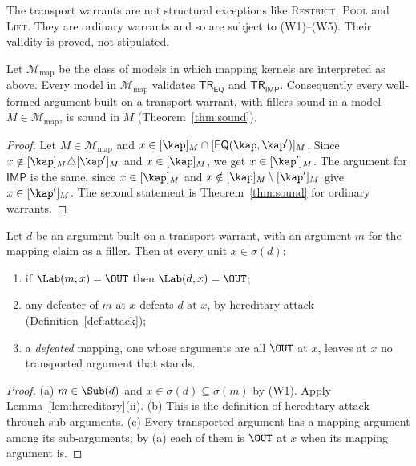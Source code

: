 The transport warrants are not structural exceptions like \textsc{Restrict}, \textsc{Pool} and \textsc{Lift}. They are ordinary warrants and so are subject to (W1)--(W5). Their validity is proved, not stipulated.

\begin{theorem}\label{thm:transport}
Let $\mathcal M_{\mathrm{map}}$ be the class of models in which mapping kernels are interpreted as above. Every model in $\mathcal M_{\mathrm{map}}$ validates $\mathsf{TR}_{\mathsf{EQ}}$ and $\mathsf{TR}_{\mathsf{IMP}}$. Consequently every well-formed argument built on a transport warrant, with fillers sound in a model $M\in\mathcal M_{\mathrm{map}}$, is sound in $M$ (Theorem~\ref{thm:sound}).
\end{theorem}

\begin{proof}
Let $M\in\mathcal M_{\mathrm{map}}$ and $x\in[\kap]_M\cap[\mathsf{EQ}(\kap,\kap')]_M$. Since $x\notin[\kap]_M\triangle[\kap']_M$ and $x\in[\kap]_M$, we get $x\in[\kap']_M$. The argument for $\mathsf{IMP}$ is the same, since $x\in[\kap]_M$ and $x\notin[\kap]_M\setminus[\kap']_M$ give $x\in[\kap']_M$. The second statement is Theorem~\ref{thm:sound} for ordinary warrants.
\end{proof}

\begin{theorem}\label{thm:transportdefeat}
Let $d$ be an argument built on a transport warrant, with an argument $m$ for the mapping claim as a filler. Then at every unit $x\in\sigma(d)$:
\begin{enumerate}[label=(\alph*)]
\item if $\Lab(m,x)=\OUT$ then $\Lab(d,x)=\OUT$;
\item any defeater of $m$ at $x$ defeats $d$ at $x$, by hereditary attack (Definition~\ref{def:attack});
\item a \emph{defeated} mapping, one whose arguments are all $\OUT$ at $x$, leaves at $x$ no transported argument that stands.
\end{enumerate}
\end{theorem}

\begin{proof}
(a) $m\in\Sub(d)$ and $x\in\sigma(d)\subseteq\sigma(m)$ by (W1). Apply Lemma~\ref{lem:hereditary}(ii). (b) This is the definition of hereditary attack through sub-arguments. (c) Every transported argument has a mapping argument among its sub-arguments; by (a) each of them is $\OUT$ at $x$ when its mapping argument is.
\end{proof}

